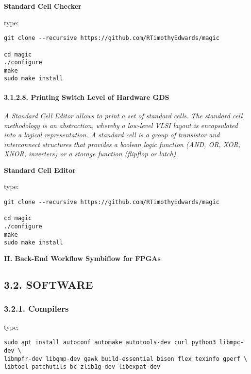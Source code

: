 \documentclass[]{article}
\let\oldparagraph\paragraph
\renewcommand{\paragraph}[1]{\oldparagraph{#1}\mbox{}}
\begin{document}
\textbf{Standard Cell Checker}

type:

\begin{verbatim}
git clone --recursive https://github.com/RTimothyEdwards/magic

cd magic
./configure
make
sudo make install
\end{verbatim}

\hypertarget{printing-switch-level-of-hardware-gds}{%
\paragraph{3.1.2.8. Printing Switch Level of Hardware
GDS}\label{printing-switch-level-of-hardware-gds}}

\emph{A Standard Cell Editor allows to print a set of standard cells.
The standard cell methodology is an abstraction, whereby a low-level
VLSI layout is encapsulated into a logical representation. A standard
cell is a group of transistor and interconnect structures that provides
a boolean logic function (AND, OR, XOR, XNOR, inverters) or a storage
function (flipflop or latch).}

\textbf{Standard Cell Editor}

type:

\begin{verbatim}
git clone --recursive https://github.com/RTimothyEdwards/magic

cd magic
./configure
make
sudo make install
\end{verbatim}

\textbf{II. Back-End Workflow Symbiflow for FPGAs}

\hypertarget{software}{%
\subsection{3.2. SOFTWARE}\label{software}}

\hypertarget{compilers}{%
\subsubsection{3.2.1. Compilers}\label{compilers}}

type:

\begin{verbatim}
sudo apt install autoconf automake autotools-dev curl python3 libmpc-dev \
libmpfr-dev libgmp-dev gawk build-essential bison flex texinfo gperf \
libtool patchutils bc zlib1g-dev libexpat-dev
\end{verbatim}
\end{document}
